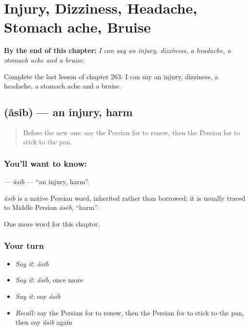 
\chapter{Injury, Dizziness, Headache, Stomach ache, Bruise}
\label{ch:fa-injury-dizziness-headache-stomach-ache-bruise}

\begin{chapteropening}
\textbf{By the end of this chapter:} \emph{I can say an injury, dizziness, a headache, a stomach ache and a bruise.}

Complete the last lesson of chapter 263: I can say an injury, dizziness, a headache, a stomach ache and a bruise.
\end{chapteropening}

\section[\texorpdfstring{\fa{آسیب} (âsib)}{آسیب (âsib)}]{ (âsib) — an injury, harm}

\label{lesson:FA-C263-asib}



\begin{quote}
Before the new one: say the Persian for to renew, then the Persian for to stick to the pan.
\end{quote}

\subsection*{You'll want to know: }
\textbf{} — \emph{âsib} — \textquotedblleft{}an injury, harm\textquotedblright{}.

\begin{cousinweb}
\emph{âsib} is a native Persian word, inherited rather than borrowed; it is usually traced to Middle Persian \emph{āsēb}, \textquotedblleft{}harm\textquotedblright{}.
\end{cousinweb}

\begin{grammarlens}[title={What you've built}]
One more word for this chapter.
\end{grammarlens}

\subsection*{Your turn}
\begin{itemize}
\raggedright
  \item \emph{Say it:} \emph{âsib}
  \item \emph{Say it:} \emph{âsib}, once more
  \item \emph{Say it:} say \emph{âsib}
  \item \emph{Recall:} say the Persian for to renew, then the Persian for to stick to the pan, then say \emph{âsib} again
\end{itemize}

